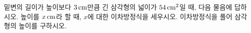 밑변의 길이가 높이보다 $3\mkern3mu \mathrm{cm}$만큼 긴 삼각형의 넓이가 $54\mkern3mu \mathrm{cm}^2$일 때, 다음 물음에 답하시오.
 높이를 $x\mkern3mu \mathrm{cm}$라 할 때, $x$에 대한 이차방정식을 세우시오.
 이차방정식을 풀어 삼각형의 높이를 구하시오.
